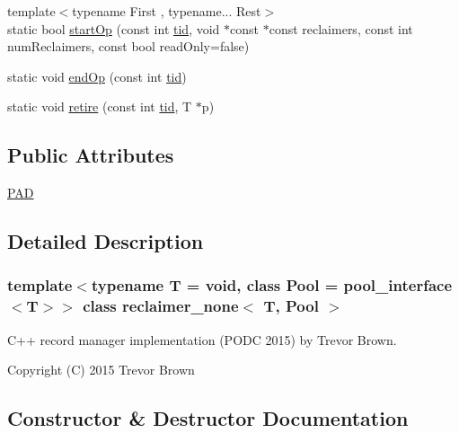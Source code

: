 \begin{DoxyCompactItemize}
\item 
{\footnotesize template$<$typename First , typename... Rest$>$ }\\static bool \hyperlink{classreclaimer__none_a320e4964cc7b800368b532b4a39c2457}{start\+Op} (const int \hyperlink{microbench_2main_8cpp_a9ca9869868fe7e7a38a921cc7de4103f}{tid}, void $\ast$const $\ast$const reclaimers, const int num\+Reclaimers, const bool read\+Only=false)
\item 
static void \hyperlink{classreclaimer__none_a07e8438b0ae46062974a5ee363c7804b}{end\+Op} (const int \hyperlink{microbench_2main_8cpp_a9ca9869868fe7e7a38a921cc7de4103f}{tid})
\item 
static void \hyperlink{classreclaimer__none_aa086c5d645d3ab8098b0015b9ed90489}{retire} (const int \hyperlink{microbench_2main_8cpp_a9ca9869868fe7e7a38a921cc7de4103f}{tid}, T $\ast$p)
\end{DoxyCompactItemize}
\subsection*{Public Attributes}
\begin{DoxyCompactItemize}
\item 
\hyperlink{classreclaimer__none_a7a92a357656b3b49cee95a230cd12d69}{P\+AD}
\end{DoxyCompactItemize}


\subsection{Detailed Description}
\subsubsection*{template$<$typename T = void, class Pool = pool\+\_\+interface$<$\+T$>$$>$\newline
class reclaimer\+\_\+none$<$ T, Pool $>$}

C++ record manager implementation (P\+O\+DC 2015) by Trevor Brown.

Copyright (C) 2015 Trevor Brown 

\subsection{Constructor \& Destructor Documentation}
\mbox{\label{classreclaimer__none_a05c1dab65707686e75d2263c4e4a8a9b}} 
